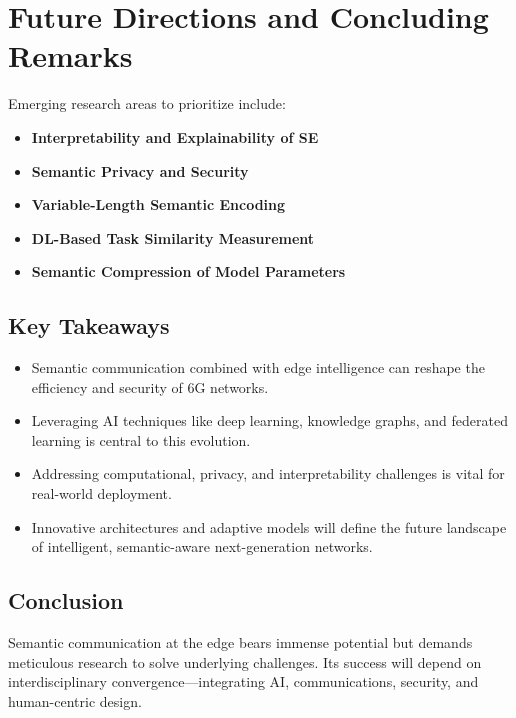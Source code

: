 \documentclass[conference]{IEEEtran}
\begin{document}
\section{Future Directions and Concluding Remarks}
Emerging research areas to prioritize include:
\begin{itemize}
    \item \textbf{Interpretability and Explainability of SE}
    \item \textbf{Semantic Privacy and Security}
    \item \textbf{Variable-Length Semantic Encoding}
    \item \textbf{DL-Based Task Similarity Measurement}
    \item \textbf{Semantic Compression of Model Parameters}
\end{itemize}

\subsection{Key Takeaways}
\begin{itemize}
    \item Semantic communication combined with edge intelligence can reshape the efficiency and security of 6G networks.
    \item Leveraging AI techniques like deep learning, knowledge graphs, and federated learning is central to this evolution.
    \item Addressing computational, privacy, and interpretability challenges is vital for real-world deployment.
    \item Innovative architectures and adaptive models will define the future landscape of intelligent, semantic-aware next-generation networks.
\end{itemize}

\subsection{Conclusion}
Semantic communication at the edge bears immense potential but demands meticulous research to solve underlying challenges. Its success will depend on interdisciplinary convergence—integrating AI, communications, security, and human-centric design.
\end{document}
